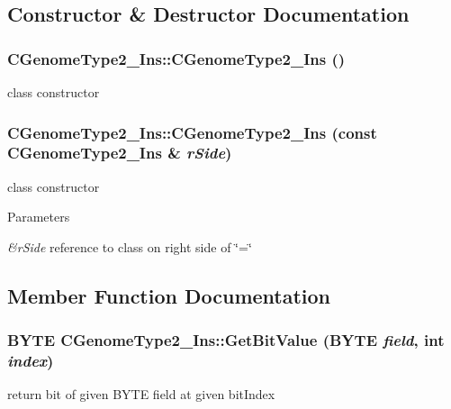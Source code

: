 \subsection{Constructor \& Destructor Documentation}
\hypertarget{classCGenomeType2__Ins_a048014721936129050d2f72c0b2ec950}{
\subsubsection[{CGenomeType2\_\-Ins}]{\setlength{\rightskip}{0pt plus 5cm}CGenomeType2\_\-Ins::CGenomeType2\_\-Ins ()}}
\label{classCGenomeType2__Ins_a048014721936129050d2f72c0b2ec950}
class constructor \hypertarget{classCGenomeType2__Ins_a0b7e8f1ad3282bfda4223de5b2cdc7d2}{
\subsubsection[{CGenomeType2\_\-Ins}]{\setlength{\rightskip}{0pt plus 5cm}CGenomeType2\_\-Ins::CGenomeType2\_\-Ins (const {\bf CGenomeType2\_\-Ins} \& {\em rSide})}}
\label{classCGenomeType2__Ins_a0b7e8f1ad3282bfda4223de5b2cdc7d2}
class constructor


\begin{DoxyParams}{Parameters}
\item[{\em \&rSide}]reference to class on right side of \char`\"{}=\char`\"{} \end{DoxyParams}


\subsection{Member Function Documentation}
\hypertarget{classCGenomeType2__Ins_a1ec35ff3d5c9ff3902740d2a904c6fab}{
\subsubsection[{GetBitValue}]{\setlength{\rightskip}{0pt plus 5cm}BYTE CGenomeType2\_\-Ins::GetBitValue (BYTE {\em field}, \/  int {\em index})}}
\label{classCGenomeType2__Ins_a1ec35ff3d5c9ff3902740d2a904c6fab}
return bit of given BYTE field at given bitIndex


